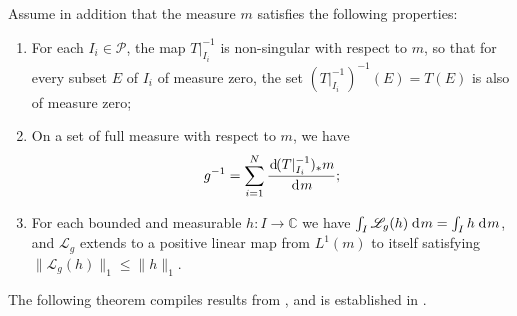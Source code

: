 \documentclass[12pt]{amsart}
\numberwithin{equation}{section} %
\numberwithin{figure}{section} %
\theoremstyle{plain}
\theoremstyle{definition}
\theoremstyle{remark}
\theoremstyle{citing}
\newcommand{\C}{\mathbb{C}}
\renewcommand{\=}{\coloneqq}
\newcommand{\dd}{\hspace{1pt}\operatorname{d}\hspace{-1pt}}
\begin{document}
Assume in addition that the measure $m$ satisfies
the following properties:
\begin{enumerate}[label=\textbf{H\arabic*.}, ref=H\arabic*]
    \item\label{itm H1} For each $I_i\in\mathcal{P}$, the map $T|_{I_i}^{-1}$ is non-singular with respect to $m$, so that for every subset $E$ of $I_i$ of measure zero, the set $(T|_{I_i}^{-1})^{-1}(E)= T(E)$ is also of measure zero;
    \item\label{itm H2} On a set of full measure with respect to $m$, we have
    \begin{equation*}
        g^{-1} = \sum_{i=1}^{N} \frac{\dd(T|^{-1}_{I_i})_{*} m}{\dd m};
    \end{equation*}
    \item\label{itm H3} For each bounded and measurable $h: I\to \C$ we have $\int_I \mathscr{L}_g(h)\dd m = \int_{I} h \dd m$, and $\mathscr{L}_g$ extends to a positive linear map from $L^{1}(m)$ to itself satisfying $\lVert\mathscr{L}_g(h)\rVert_1 \leq \lVert h\rVert_1$.
\end{enumerate}
The following theorem compiles results from \cite[Theorems 3.2 and 3.3]{Keller1}, and is established in \cite[Theorem 1]{Juan1}.
\end{document}
